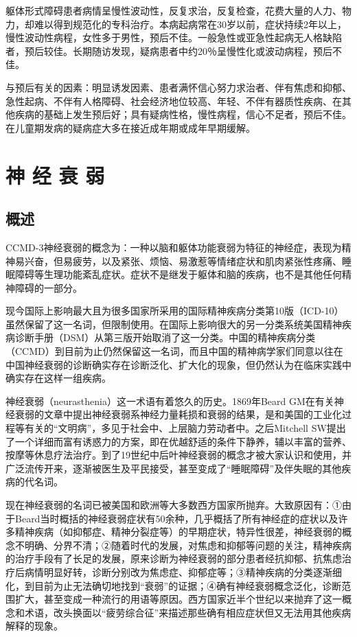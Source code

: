 躯体形式障碍患者病情呈慢性波动性，反复求治，反复检查，花费大量的人力、物力，却难以得到规范化的专科治疗。本病起病常在30岁以前，症状持续2年以上，慢性波动性病程，女性多于男性，预后不佳。一般急性或亚急性起病无人格缺陷者，预后较佳。长期随访发现，疑病患者中约20％呈慢性化或波动病程，预后不佳。

与预后有关的因素：明显诱发因素、患者满怀信心努力求治者、伴有焦虑和抑郁、急性起病、不伴有人格障碍、社会经济地位较高、年轻、不伴有器质性疾病、在其他疾病的基础上发生预后好；具有疑病性格，慢性病程，信心不足者，预后不佳。在儿童期发病的疑病症大多在接近成年期或成年早期缓解。

\section{神 经 衰 弱}

\subsection{概述}

CCMD-3神经衰弱的概念为：一种以脑和躯体功能衰弱为特征的神经症，表现为精神易兴奋，但易疲劳，以及紧张、烦恼、易激惹等情绪症状和肌肉紧张性疼痛、睡眠障碍等生理功能紊乱症状。症状不是继发于躯体和脑的疾病，也不是其他任何精神障碍的一部分。

现今国际上影响最大且为很多国家所采用的国际精神疾病分类第10版（ICD-10）虽然保留了这一名词，但限制使用。在国际上影响很大的另一分类系统美国精神疾病诊断手册（DSM）从第三版开始取消了这一分类。中国的精神疾病分类（CCMD）到目前为止仍然保留这一名词，而且中国的精神病学家们同意以往在中国神经衰弱的诊断确实存在诊断泛化、扩大化的现象，但仍然认为在临床实践中确实存在这样一组疾病。

神经衰弱（neurasthenia）这一术语有着悠久的历史。1869年Beard
GM在有关神经衰弱的文章中提出神经衰弱系神经力量耗损和衰弱的结果，是和美国的工业化过程等有关的“文明病”，多见于社会中、上层脑力劳动者中。之后Mitchell
SW提出了一个详细而富有诱惑力的方案，即在优越舒适的条件下静养，辅以丰富的营养、按摩等休息疗法治疗。到了19世纪中后叶神经衰弱的概念才被大家认识和使用，并广泛流传开来，逐渐被医生及平民接受，甚至变成了“睡眠障碍”及伴失眠的其他疾病的代名词。

现在神经衰弱的名词已被美国和欧洲等大多数西方国家所抛弃。大致原因有：①由于Beard当时概括的神经衰弱症状有50余种，几乎概括了所有神经症的症状以及许多精神疾病（如抑郁症、精神分裂症等）的早期症状，特异性很差，神经衰弱的概念不明确、分界不清；②随着时代的发展，对焦虑和抑郁等问题的关注，精神疾病的治疗手段有了长足的发展，原来诊断为神经衰弱的部分患者经抗抑郁、抗焦虑治疗后病情明显好转，诊断分别改为焦虑症、抑郁症等；③精神疾病的分类逐渐细化，到目前为止无法确切地找到“衰弱”的证据；④确有神经衰弱概念泛化，诊断范围扩大，甚至变成一种流行的用语等原因。西方国家近半个世纪以来抛弃了这一概念和术语，改头换面以“疲劳综合征”来描述那些确有相应症状但又无法用其他疾病解释的现象。


